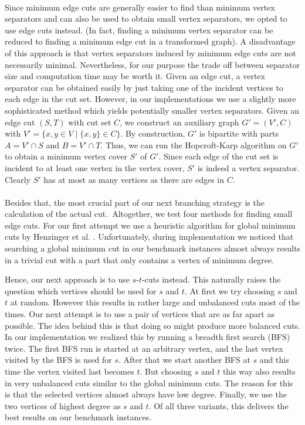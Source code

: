 \documentclass[]{article}
\begin{document}
\paragraph{}
Since minimum edge cuts are generally easier to find than minimum vertex separators and can also be used to obtain small vertex separators, we opted to use edge cuts instead. (In fact, finding a minimum vertex separator can be reduced to finding a minimum edge cut in a transformed graph). A disadvantage of this approach is that vertex separators induced by minimum edge cuts are not necessarily minimal. Nevertheless, for our purpose the trade off between separator size and computation time may be worth it. Given an edge cut, a vertex separator can be obtained easily by just taking one of the incident vertices to each edge in the cut set. However, in our implementations we use a slightly more sophisticated method which yields potentially smaller vertex separators. Given an edge cut $(S,T)$ with cut set $C$, we construct an auxiliary graph $G'=(V',C)$  with $V' = \{x,y\in V\;|\;\{x,y\}\in C\}$. By construction, $G'$ is bipartite with parts $A = V'\cap S$ and $B = V'\cap T$. Thus, we can run the Hopcroft-Karp algorithm \cite{bibid} on $G'$ to obtain a minimum vertex cover $S'$ of $G'$. Since each edge of the cut set is incident to at least one vertex in the vertex cover, $S'$ is indeed a vertex separator. Clearly $S'$ has at most as many vertices as there are edges in $C$.
\paragraph{}
Besides that, the most crucial part of our next branching strategy is the calculation of the actual cut.~Altogether, we test four methods for finding small edge cuts. For our first attempt we use a heuristic algorithm for global minimum cuts by Henzinger et al. \cite{bibid}. Unfortunately, during implementation we noticed that searching a global minimum cut in our benchmark instances almost always results in a trivial cut with a part that only contains a vertex of minimum degree.

Hence, our next approach is  to use $s$-$t$-cuts instead. This naturally raises the question which vertices should be used for $s$ and $t$. At first we try choosing $s$ and $t$ at random. However this results in rather large and unbalanced cuts most of the times. Our next attempt is to use a pair of vertices that are as far apart as possible. The idea behind this is that doing so might produce more balanced cuts. In our implementation we realized this by running a breadth first search (BFS) twice. The first BFS run is started at an arbitrary vertex, and the last vertex visited by the BFS is used for $s$. After that we start another BFS at $s$ and this time the vertex visited last becomes $t$. But choosing $s$ and $t$ this way also results in very unbalanced cuts similar to the global minimum cuts. The reason for this is that the selected vertices almost always have low degree. Finally, we use the two vertices of highest degree as $s$ and $t$. Of all three variants, this delivers the best results on our benchmark instances.
\end{document}
